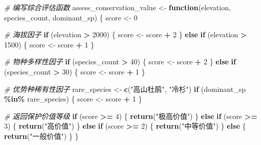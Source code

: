 \documentclass[
]{book}
\newenvironment{Shaded}{\begin{snugshade}}{\end{snugshade}}
\newcommand{\CommentTok}[1]{\textcolor[rgb]{0.56,0.35,0.01}{\textit{#1}}}
\newcommand{\ControlFlowTok}[1]{\textcolor[rgb]{0.13,0.29,0.53}{\textbf{#1}}}
\newcommand{\DecValTok}[1]{\textcolor[rgb]{0.00,0.00,0.81}{#1}}
\newcommand{\FunctionTok}[1]{\textcolor[rgb]{0.13,0.29,0.53}{\textbf{#1}}}
\newcommand{\NormalTok}[1]{#1}
\newcommand{\OtherTok}[1]{\textcolor[rgb]{0.56,0.35,0.01}{#1}}
\newcommand{\SpecialCharTok}[1]{\textcolor[rgb]{0.81,0.36,0.00}{\textbf{#1}}}
\newcommand{\StringTok}[1]{\textcolor[rgb]{0.31,0.60,0.02}{#1}}
\begin{document}
\begin{Shaded}
\begin{Highlighting}[]
\CommentTok{\# 编写综合评估函数}
\NormalTok{assess\_conservation\_value }\OtherTok{\textless{}{-}} \ControlFlowTok{function}\NormalTok{(elevation, species\_count, dominant\_sp) \{}
\NormalTok{  score }\OtherTok{\textless{}{-}} \DecValTok{0}
  
  \CommentTok{\# 海拔因子}
  \ControlFlowTok{if}\NormalTok{ (elevation }\SpecialCharTok{\textgreater{}} \DecValTok{2000}\NormalTok{) \{}
\NormalTok{    score }\OtherTok{\textless{}{-}}\NormalTok{ score }\SpecialCharTok{+} \DecValTok{2}
\NormalTok{  \} }\ControlFlowTok{else} \ControlFlowTok{if}\NormalTok{ (elevation }\SpecialCharTok{\textgreater{}} \DecValTok{1500}\NormalTok{) \{}
\NormalTok{    score }\OtherTok{\textless{}{-}}\NormalTok{ score }\SpecialCharTok{+} \DecValTok{1}
\NormalTok{  \}}
  
  \CommentTok{\# 物种多样性因子}
  \ControlFlowTok{if}\NormalTok{ (species\_count }\SpecialCharTok{\textgreater{}} \DecValTok{40}\NormalTok{) \{}
\NormalTok{    score }\OtherTok{\textless{}{-}}\NormalTok{ score }\SpecialCharTok{+} \DecValTok{2}
\NormalTok{  \} }\ControlFlowTok{else} \ControlFlowTok{if}\NormalTok{ (species\_count }\SpecialCharTok{\textgreater{}} \DecValTok{30}\NormalTok{) \{}
\NormalTok{    score }\OtherTok{\textless{}{-}}\NormalTok{ score }\SpecialCharTok{+} \DecValTok{1}
\NormalTok{  \}}
  
  \CommentTok{\# 优势种稀有性因子}
\NormalTok{  rare\_species }\OtherTok{\textless{}{-}} \FunctionTok{c}\NormalTok{(}\StringTok{"高山杜鹃"}\NormalTok{, }\StringTok{"冷杉"}\NormalTok{)}
  \ControlFlowTok{if}\NormalTok{ (dominant\_sp }\SpecialCharTok{\%in\%}\NormalTok{ rare\_species) \{}
\NormalTok{    score }\OtherTok{\textless{}{-}}\NormalTok{ score }\SpecialCharTok{+} \DecValTok{1}
\NormalTok{  \}}
  
  \CommentTok{\# 返回保护价值等级}
  \ControlFlowTok{if}\NormalTok{ (score }\SpecialCharTok{\textgreater{}=} \DecValTok{4}\NormalTok{) \{}
    \FunctionTok{return}\NormalTok{(}\StringTok{"极高价值"}\NormalTok{)}
\NormalTok{  \} }\ControlFlowTok{else} \ControlFlowTok{if}\NormalTok{ (score }\SpecialCharTok{\textgreater{}=} \DecValTok{3}\NormalTok{) \{}
    \FunctionTok{return}\NormalTok{(}\StringTok{"高价值"}\NormalTok{)}
\NormalTok{  \} }\ControlFlowTok{else} \ControlFlowTok{if}\NormalTok{ (score }\SpecialCharTok{\textgreater{}=} \DecValTok{2}\NormalTok{) \{}
    \FunctionTok{return}\NormalTok{(}\StringTok{"中等价值"}\NormalTok{)}
\NormalTok{  \} }\ControlFlowTok{else}\NormalTok{ \{}
    \FunctionTok{return}\NormalTok{(}\StringTok{"一般价值"}\NormalTok{)}
\NormalTok{  \}}
\NormalTok{\}}


\end{Highlighting}
\end{Shaded}
\end{document}
